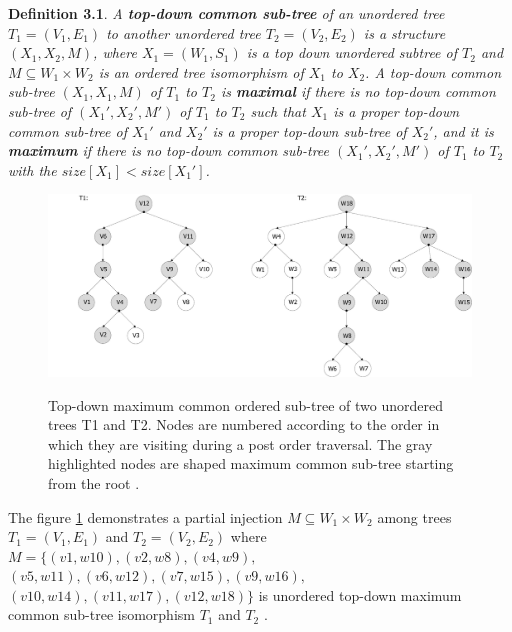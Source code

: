 \documentclass{report}
\begin{document}
\textbf{Definition 3.1}. \emph{
A \textbf{top-down common sub-tree} of an unordered tree $ T_{1} = ( V_{1}, E_{1})$ to another unordered tree $ T_{2} = ( V_{2}, E_{2})$ is a structure 
$ (X_{1}, X_{2}, M)$, where $ X_{1} = (W_{1}, S_{1})$ is a top down unordered subtree of $ T_{2}$ and $M \subseteq W_{1} \times  W_{2}$ is an ordered tree isomorphism of $ X_{1}$ to $ X_{2}$. A top-down common sub-tree $ (X_{1}, X_{1}, M)$ of $ T_{1}$ to $ T_{2}$ is \textbf{maximal} if there is no top-down common sub-tree of $ (X_{1}', X_{2}', M')$ of $ T_{1}$ to $ T_{2}$ such that $ X_{1}$  is a proper top-down common sub-tree of $ X_{1}'$ and $ X_{2}'$ is a proper top-down sub-tree of $ X_{2}'$, and it is \textbf{maximum} if there is no top-down common sub-tree $ (X_{1}', X_{2}', M')$  of $ T_{1}$ to $ T_{2}$ with the $size[X_{1}] < size[X_{1}']$\cite{valiente}.
}

\begin{figure}[hb]
  \centering
  \includegraphics[scale=0.45]{Figures/algorithms/TD/top-down-max-common-example-adjusted.pdf}\\[0.1cm]
  \caption[Top-down maximum common ordered sub-tree of two unordered trees T1 and T2]{Top-down maximum common ordered sub-tree of two unordered trees T1 and T2. Nodes are numbered according to the order in which they are visiting during a post order traversal. The gray highlighted nodes are shaped maximum common sub-tree starting from the root \cite{valiente}.}
  \label{fig:top-down-max-common-example-adjusted}
\end{figure}

The figure \ref{fig:top-down-max-common-example-adjusted} demonstrates a partial injection $M \subseteq W_{1} \times  W_{2}$ among trees $ T_{1} = ( V_{1}, E_{1})$ and  $ T_{2} = ( V_{2}, E_{2})$ where $M  = \{ (v1,w10),  (v2,w8), (v4,w9), $ \\
$(v5,w11),  (v6,w12),  (v7,w15),  (v9,w16), $  $ (v10,w14),  (v11,w17),  (v12,w18)\}$ is unordered top-down maximum common sub-tree isomorphism $ T_{1}$ and $ T_{2 }$ \cite{valiente}.
\end{document}
